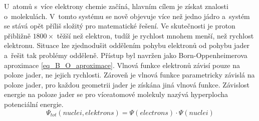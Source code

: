 \documentclass[
  printed, %
  table,   %
  lof,     %
  lot,     %
  oneside,
]{fithesis3}
\begin{document}
U~atomů s~více  elektrony chemie začíná, hlavním cílem je získat znalosti o~molekulách. V~tomto systému se nově objevuje více než jedno jádro a~systém se stává opět příliš složitý pro matematické řešení. Ve skutečnosti je proton přibližně $1800 \times$ těžší než elektron, tudíž je rychlost mnohem menší, než rychlost elektronu. Situace lze zjednodušit oddělením pohybu elektronů od pohybu jader a~řešit tak problémy odděleně. Přístup byl navržen jako Born-Oppenheimerova aproximace \ref{eq_B_O_aproximace}. Vlnová funkce elektronů závisí pouze na poloze jader, ne jejich rychlosti\cite{lechamolecularmodeling}. Zároveň je vlnová funkce parametricky závislá na poloze jader, pro každou geometrii jader je získána jiná vlnová funkce. Závislost energie na poloze jader se pro víceatomové molekuly nazývá hyperplocha potenciální energie\cite{dftshrnutivysledky}.
\begin{equation}
\Psi_{tot}(nuclei, elektrons) = \Psi(electrons) \cdot \Psi(nuclei)
\label{eq_B_O_aproximace} 
\end{equation}
\end{document}

